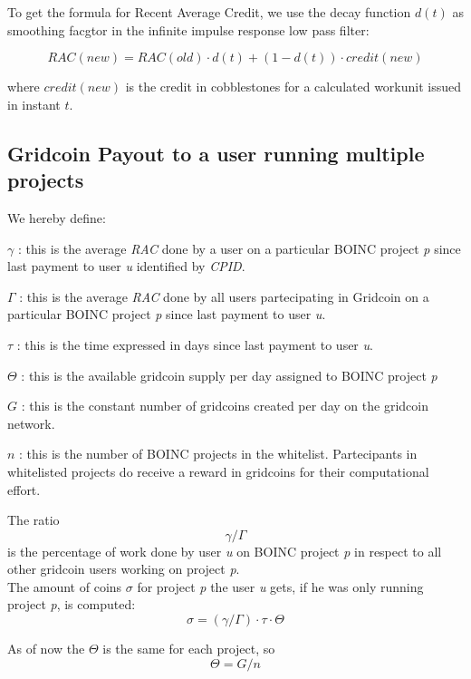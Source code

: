 To get the formula for Recent Average Credit, we use the decay function $d(t)$ as smoothing facgtor in the infinite impulse response low pass filter:

\begin{equation}
RAC(new) = RAC(old) \cdot d(t) + (1-d(t)) \cdot credit(new)
\end{equation}

where $credit(new)$ is the credit in cobblestones for a calculated workunit issued in instant $t$.

\subsection{Gridcoin Payout to a user running multiple projects}

We hereby define:
\begin{description}
  \item{$\gamma$} : this is the average \textit{RAC} done by a user on a particular BOINC project \textit{p} since last payment to user \textit{u} identified by \textit{CPID}.
  \item{$\Gamma$} : this is the average \textit{RAC} done by all users partecipating in Gridcoin on a particular BOINC project \textit{p} since last payment to user \textit{u}.
  \item{$\tau$} : this is the time expressed in days since last payment to user \textit{u}.
  \item{$\Theta$} : this is the available gridcoin supply per day assigned to BOINC project \textit{p}
  \item{$G$} : this is the constant number of gridcoins created per day on the gridcoin network. 
  \item{$n$} : this is the number of BOINC projects in the whitelist. Partecipants in whitelisted projects do receive a reward in gridcoins for their computational effort.  
\end{description}

The ratio
\[\gamma/\Gamma\]
is the percentage of work done by user \textit{u} on BOINC project \textit{p} in respect to all other gridcoin users working on project \textit{p}.\\

The amount of coins $\sigma$ for project \textit{p} the user \textit{u} gets, if he was only running project \textit{p}, is computed:
\[ \sigma = (\gamma / \Gamma) \cdot \tau \cdot \Theta \]

As of now the $\Theta$ is the same for each project, so
\[ \Theta = G/n \]


